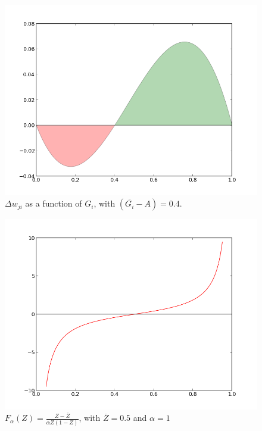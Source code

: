 \documentclass{article}
\theoremstyle{definition}
\begin{document}
\begin{figure}
\includegraphics{covar.png}
\caption{$\Delta w_{ji}$ as a function of $G_i$, with $(\overline{G_i} - A) = 0.4$.}
\label{fig-bcm}
\end{figure}

\begin{figure}
\includegraphics{zgraph.png}
\caption{$F_\alpha(Z) = \frac{Z - \overline{Z}}{\alpha Z(1-Z)}$, with $\overline{Z}
  = 0.5$ and $\alpha=1$}
\label{fig-zgraph}
\end{figure}
\end{document}
